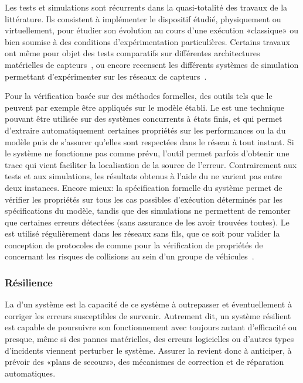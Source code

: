 Les tests et simulations sont récurrents dans la quasi-totalité des travaux de la littérature.
Ils consistent à implémenter le dispositif étudié, physiquement ou virtuellement, pour étudier son évolution au cours d'une exécution «classique» ou bien soumise à des conditions d'expérimentation particulières.
Certains travaux ont même pour objet des tests comparatifs sur différentes architectures matérielles de capteurs~\cite{PLP06}, ou encore recensent les différents systèmes de simulation permettant d'expérimenter sur les réseaux de capteurs~\cite{AAAHN12}.

Pour la vérification basée sur des méthodes formelles, des outils tels que le \modelchecking peuvent par exemple être appliqués sur le modèle établi.
Le \modelchecking est une technique pouvant être utilisée sur des systèmes concurrents à états finis, et qui permet d'extraire automatiquement certaines propriétés sur les performances ou la  du modèle puis de s'assurer qu'elles sont respectées dans le réseau à tout instant.
Si le système ne fonctionne pas comme prévu, l'outil permet parfois d'obtenir une trace qui vient faciliter la localisation de la source de l'erreur.
Contrairement aux tests et aux simulations, les résultats obtenus à l'aide du \modelchecking ne varient pas entre deux instances.
Encore mieux: la spécification formelle du système permet de vérifier les propriétés sur tous les cas possibles d'exécution déterminés par les spécifications du modèle, tandis que des simulations ne permettent de remonter que certaines erreurs détectées (sans assurance de les avoir trouvées toutes).
Le \modelchecking est utilisé régulièrement dans les réseaux sans fils, que ce soit pour valider la conception de protocoles de  comme pour la vérification de propriétés de  concernant les risques de collisions au sein d'un groupe de véhicules~\cite{E-ZCGGK12}.

        \subsubsection{Résilience}
La \resilience d'un système est la capacité de ce système à outrepasser et éventuellement à corriger les erreurs susceptibles de survenir.
Autrement dit, un système résilient est capable de poursuivre son fonctionnement avec toujours autant d'efficacité ou presque, même si des pannes matérielles, des erreurs logicielles ou d'autres types d'incidents viennent perturber le système.
Assurer la \resilience revient donc à anticiper, à prévoir des «plans de secours», des mécanismes de correction et de réparation automatiques.

